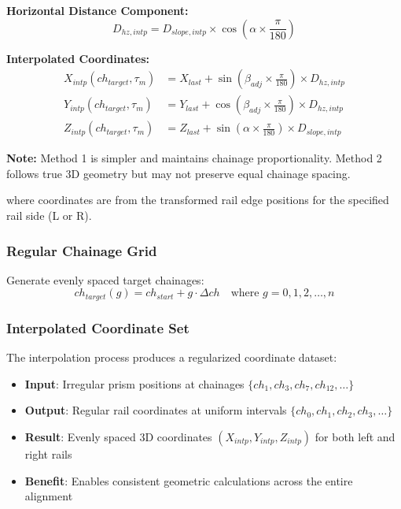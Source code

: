 \documentclass{article}
\begin{document}
\textbf{Horizontal Distance Component:}
\begin{equation}
D_{hz,intp} = D_{slope,intp} \times \cos(\alpha \times \frac{\pi}{180})
\end{equation}

\textbf{Interpolated Coordinates:}
\begin{align}
X_{intp}(ch_{target}, \tau_m) &= X_{last} + \sin(\beta_{adj} \times \frac{\pi}{180}) \times D_{hz,intp} \\
Y_{intp}(ch_{target}, \tau_m) &= Y_{last} + \cos(\beta_{adj} \times \frac{\pi}{180}) \times D_{hz,intp} \\
Z_{intp}(ch_{target}, \tau_m) &= Z_{last} + \sin(\alpha \times \frac{\pi}{180}) \times D_{slope,intp}
\end{align}

\textbf{Note:} Method 1 is simpler and maintains chainage proportionality. Method 2 follows true 3D geometry but may not preserve equal chainage spacing.

where coordinates are from the transformed rail edge positions for the specified rail side (L or R).

\subsubsection{Regular Chainage Grid}
Generate evenly spaced target chainages:
\begin{equation}
ch_{target}(g) = ch_{start} + g \cdot \Delta ch \quad \text{where } g = 0, 1, 2, \ldots, n
\end{equation}

\subsubsection{Interpolated Coordinate Set}
The interpolation process produces a regularized coordinate dataset:
\begin{itemize}
\item \textbf{Input}: Irregular prism positions at chainages $\{ch_1, ch_3, ch_7, ch_{12}, \ldots\}$
\item \textbf{Output}: Regular rail coordinates at uniform intervals $\{ch_0, ch_1, ch_2, ch_3, \ldots\}$
\item \textbf{Result}: Evenly spaced 3D coordinates $(X_{intp}, Y_{intp}, Z_{intp})$ for both left and right rails
\item \textbf{Benefit}: Enables consistent geometric calculations across the entire alignment
\end{itemize}
\end{document}
